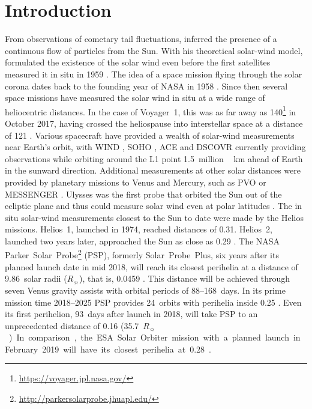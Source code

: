 \documentclass[]{aa}
\newcommand{\Rs}{$R_\sun{}$}
\begin{document}
        \section{Introduction}
        From observations of cometary tail fluctuations, \citet{Biermann1951} inferred the presence of a continuous flow of particles from the Sun. With his theoretical solar-wind model, \citet{Parker1958} formulated the existence of the solar wind even before the first satellites measured it in situ in 1959 \citep{Gringauz1960,Neugebauer1966}.
        The idea of a space mission flying through the solar corona dates back to the founding year of NASA in 1958 \citep{McComas2008}. Since then several space missions have measured the solar wind in situ at a wide range of heliocentric distances. In the case of Voyager~1, this was as far away as \SI{140}{\au}\footnote{\url{https://voyager.jpl.nasa.gov/}} in October 2017, having crossed the heliospause into interstellar space at a distance of \SI{121}{\au} \citep{Gurnett2013}.
        Various spacecraft have provided a wealth of solar-wind measurements near Earth’s orbit, with WIND \citep{Lepping1995,Ogilvie1995}, SOHO \citep{Domingo1995}, ACE \citep{Stone1998} and DSCOVR \citep{Burt2012} currently providing observations while orbiting around the L1 point \SI{1.5}{million\,\km} ahead of Earth in the sunward direction. Additional measurements at other solar distances were provided by planetary missions to Venus and Mercury, such as PVO \citep{Colin1980} or MESSENGER \citep{Belcher1991}. Ulysses was the first probe that orbited the Sun out of the ecliptic plane and thus could measure solar wind even at polar latitudes \citep{McComas1998}. The in situ solar-wind measurements closest to the Sun to date were made by the Helios missions. Helios~1, launched in 1974, reached distances of \SI{0.31}{\au}. Helios~2, launched two years later, approached the Sun as close as \SI{0.29}{\au} \citep{Rosenbauer1977}.
        The NASA Parker~Solar~Probe\footnote{\url{http://parkersolarprobe.jhuapl.edu/}} (PSP), formerly Solar~Probe~Plus, six years after its planned launch date in mid 2018, will reach its closest perihelia at a distance of 9.86~solar radii (\Rs), that is, \SI{0.0459}{\au} \citep{Fox2015}. This distance will be achieved through seven Venus gravity assists with orbital periods of 88--168~days. In its prime mission time 2018--2025 PSP provides 24~orbits with perihelia inside \SI{0.25}{\au} \citep{Fox2015}. Even its first perihelion, 93~days after launch in 2018, will take PSP to an unprecedented distance of \SI{0.16}{\au} (\SI{35.7}{\Rs}). In comparison, the ESA Solar Orbiter mission with a planned launch in February 2019 will have its closest perihelia at \SI{0.28}{\au} \citep{Muller2013}.
\end{document}
